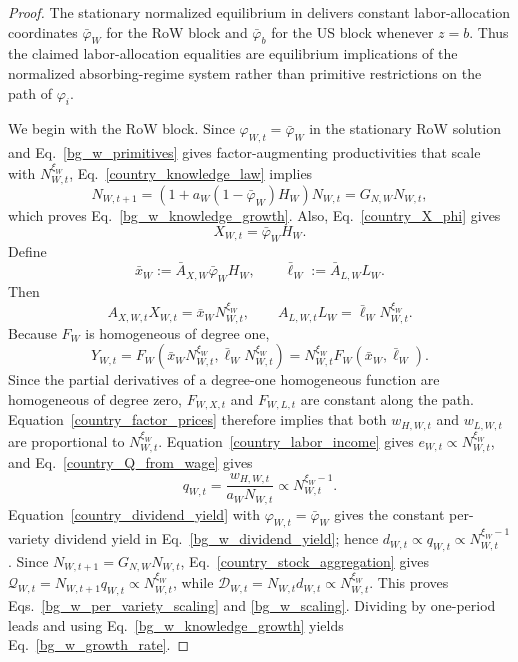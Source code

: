 \documentclass{article}
\begin{document}
\begin{proof}
The stationary normalized equilibrium in  delivers constant labor-allocation coordinates $\bar\varphi_W$ for the RoW block and $\bar\varphi_b$ for the US block whenever $z=b$. Thus the claimed labor-allocation equalities are equilibrium implications of the normalized absorbing-regime system rather than primitive restrictions on the path of $\varphi_i$.

We begin with the RoW block. Since $\varphi_{W,t}=\bar\varphi_W$ in the stationary RoW solution and Eq.~\eqref{bg_w_primitives} gives factor-augmenting productivities that scale with $N_{W,t}^{\xi_W}$, Eq.~\eqref{country_knowledge_law} implies
\[
N_{W,t+1}=(1+a_W(1-\bar\varphi_W)H_W)N_{W,t}=G_{N,W}N_{W,t},
\]
which proves Eq.~\eqref{bg_w_knowledge_growth}. Also, Eq.~\eqref{country_X_phi} gives
\[
X_{W,t}=\bar\varphi_W H_W.
\]
Define
\[
\bar x_W:=\bar A_{X,W}\bar\varphi_W H_W,
\qquad
\bar \ell_W:=\bar A_{L,W}L_W.
\]
Then
\[
A_{X,W,t}X_{W,t}=\bar x_W N_{W,t}^{\xi_W},
\qquad
A_{L,W,t}L_W=\bar \ell_W N_{W,t}^{\xi_W}.
\]
Because $F_W$ is homogeneous of degree one,
\[
Y_{W,t}
=
F_W(\bar x_W N_{W,t}^{\xi_W},\bar \ell_W N_{W,t}^{\xi_W})
=
N_{W,t}^{\xi_W}F_W(\bar x_W,\bar \ell_W).
\]
Since the partial derivatives of a degree-one homogeneous function are homogeneous of degree zero, $F_{W,X,t}$ and $F_{W,L,t}$ are constant along the path. Equation~\eqref{country_factor_prices} therefore implies that both $w_{H,W,t}$ and $w_{L,W,t}$ are proportional to $N_{W,t}^{\xi_W}$. Equation~\eqref{country_labor_income} gives $e_{W,t}\propto N_{W,t}^{\xi_W}$, and Eq.~\eqref{country_Q_from_wage} gives
\[
q_{W,t}=\frac{w_{H,W,t}}{a_WN_{W,t}}\propto N_{W,t}^{\xi_W-1}.
\]
Equation~\eqref{country_dividend_yield} with $\varphi_{W,t}=\bar\varphi_W$ gives the constant per-variety dividend yield in Eq.~\eqref{bg_w_dividend_yield}; hence $d_{W,t}\propto q_{W,t}\propto N_{W,t}^{\xi_W-1}$. Since $N_{W,t+1}=G_{N,W}N_{W,t}$, Eq.~\eqref{country_stock_aggregation} gives $\mathcal Q_{W,t}=N_{W,t+1}q_{W,t}\propto N_{W,t}^{\xi_W}$, while $\mathcal D_{W,t}=N_{W,t}d_{W,t}\propto N_{W,t}^{\xi_W}$. This proves Eqs.~\eqref{bg_w_per_variety_scaling} and \eqref{bg_w_scaling}. Dividing by one-period leads and using Eq.~\eqref{bg_w_knowledge_growth} yields Eq.~\eqref{bg_w_growth_rate}.


\end{proof}
\end{document}
